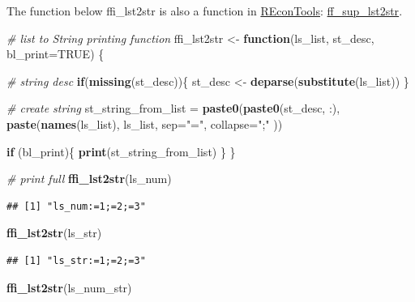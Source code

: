 \documentclass[
]{book}
\newenvironment{Shaded}{\begin{snugshade}}{\end{snugshade}}
\newcommand{\CommentTok}[1]{\textcolor[rgb]{0.56,0.35,0.01}{\textit{#1}}}
\newcommand{\ControlFlowTok}[1]{\textcolor[rgb]{0.13,0.29,0.53}{\textbf{#1}}}
\newcommand{\DataTypeTok}[1]{\textcolor[rgb]{0.13,0.29,0.53}{#1}}
\newcommand{\KeywordTok}[1]{\textcolor[rgb]{0.13,0.29,0.53}{\textbf{#1}}}
\newcommand{\NormalTok}[1]{#1}
\newcommand{\OtherTok}[1]{\textcolor[rgb]{0.56,0.35,0.01}{#1}}
\newcommand{\StringTok}[1]{\textcolor[rgb]{0.31,0.60,0.02}{#1}}
\begin{document}
The function below ffi\_lst2str is also a function in \href{https://fanwangecon.github.io/REconTools/index.html}{REconTools}: \href{https://fanwangecon.github.io/REconTools/reference/ff_sup_lst2str.html}{ff\_sup\_lst2str}.

\begin{Shaded}
\begin{Highlighting}[]
\CommentTok{\# list to String printing function}
\NormalTok{ffi\_lst2str \textless{}{-}}\StringTok{ }\ControlFlowTok{function}\NormalTok{(ls\_list, st\_desc, }\DataTypeTok{bl\_print=}\OtherTok{TRUE}\NormalTok{) \{}

  \CommentTok{\# string desc}
  \ControlFlowTok{if}\NormalTok{(}\KeywordTok{missing}\NormalTok{(st\_desc))\{}
\NormalTok{    st\_desc \textless{}{-}}\StringTok{ }\KeywordTok{deparse}\NormalTok{(}\KeywordTok{substitute}\NormalTok{(ls\_list))}
\NormalTok{  \}}

  \CommentTok{\# create string}
\NormalTok{  st\_string\_from\_list =}\StringTok{ }\KeywordTok{paste0}\NormalTok{(}\KeywordTok{paste0}\NormalTok{(st\_desc, }\StringTok{\textquotesingle{}:\textquotesingle{}}\NormalTok{),}
                               \KeywordTok{paste}\NormalTok{(}\KeywordTok{names}\NormalTok{(ls\_list), ls\_list, }\DataTypeTok{sep=}\StringTok{"="}\NormalTok{, }\DataTypeTok{collapse=}\StringTok{";"}\NormalTok{ ))}

  \ControlFlowTok{if}\NormalTok{ (bl\_print)\{}
    \KeywordTok{print}\NormalTok{(st\_string\_from\_list)}
\NormalTok{  \}}
\NormalTok{\}}

\CommentTok{\# print full}
\KeywordTok{ffi\_lst2str}\NormalTok{(ls\_num)}
\end{Highlighting}
\end{Shaded}

\begin{verbatim}
## [1] "ls_num:=1;=2;=3"
\end{verbatim}

\begin{Shaded}
\begin{Highlighting}[]
\KeywordTok{ffi\_lst2str}\NormalTok{(ls\_str)}
\end{Highlighting}
\end{Shaded}

\begin{verbatim}
## [1] "ls_str:=1;=2;=3"
\end{verbatim}

\begin{Shaded}
\begin{Highlighting}[]
\KeywordTok{ffi\_lst2str}\NormalTok{(ls\_num\_str)}
\end{Highlighting}
\end{Shaded}
\end{document}
